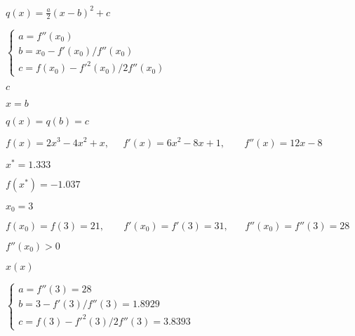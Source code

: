 \documentclass{article}
\def\lthtmlcheckvsize{\ifdim\ht\sizebox<\vsize 
  \ifdim\wd\sizebox<\hsize\expandafter\hfill\fi \expandafter\vfill
  \else\expandafter\vss\fi}%
\begin{document}
{\newpage\clearpage
{}%
$\displaystyle q(x)=\frac{a}{2}(x-b)^2+c$%
\lthtmlindisplaymathZ
\lthtmlcheckvsize\clearpage}

{\newpage\clearpage
{}%
$\displaystyle \left\{\begin{array}{l}a=f''(x_0)\\
b=x_0-f'(x_0)/f''(x_0)\\c=f(x_0)-f'^2(x_0)/2f''(x_0)
\end{array}\right.$%
\lthtmlindisplaymathZ
\lthtmlcheckvsize\clearpage}

{\newpage\clearpage
{}%
$ c$%
\lthtmlindisplaymathZ
\lthtmlcheckvsize\clearpage}

{\newpage\clearpage
{}%
$ x=b$%
\lthtmlindisplaymathZ
\lthtmlcheckvsize\clearpage}

{\newpage\clearpage
{}%
$ q(x)=q(b)=c$%
\lthtmlindisplaymathZ
\lthtmlcheckvsize\clearpage}

{\newpage\clearpage
{}%
$\displaystyle f(x)=2x^3-4x^2+x,\;\;\;\;\;f'(x)=6x^2-8x+1,\;\;\;\;\;\;\;f''(x)=12x-8$%
\lthtmlindisplaymathZ
\lthtmlcheckvsize\clearpage}

{\newpage\clearpage
{}%
$ x^*=1.333$%
\lthtmlindisplaymathZ
\lthtmlcheckvsize\clearpage}

{\newpage\clearpage
{}%
$ f(x^*)=-1.037$%
\lthtmlindisplaymathZ
\lthtmlcheckvsize\clearpage}

{\newpage\clearpage
{}%
$ x_0=3$%
\lthtmlindisplaymathZ
\lthtmlcheckvsize\clearpage}

{\newpage\clearpage
{}%
$\displaystyle f(x_0)=f(3)=21,\;\;\;\;\;\;\;f'(x_0)=f'(3)=31,\;\;\;\;\;\;f''(x_0)=f''(3)=28$%
\lthtmlindisplaymathZ
\lthtmlcheckvsize\clearpage}

{\newpage\clearpage
{}%
$ f''(x_0)>0$%
\lthtmlindisplaymathZ
\lthtmlcheckvsize\clearpage}

{\newpage\clearpage
{}%
$ x(x)$%
\lthtmlindisplaymathZ
\lthtmlcheckvsize\clearpage}

{\newpage\clearpage
{}%
$\displaystyle \left\{\begin{array}{l}
a=f''(3)=28\\
b=3-f'(3)/f''(3)=1.8929\\
c=f(3)-f'^2(3)/2f''(3)=3.8393\end{array}\right.$%
\lthtmlindisplaymathZ
\lthtmlcheckvsize\clearpage}
\end{document}
